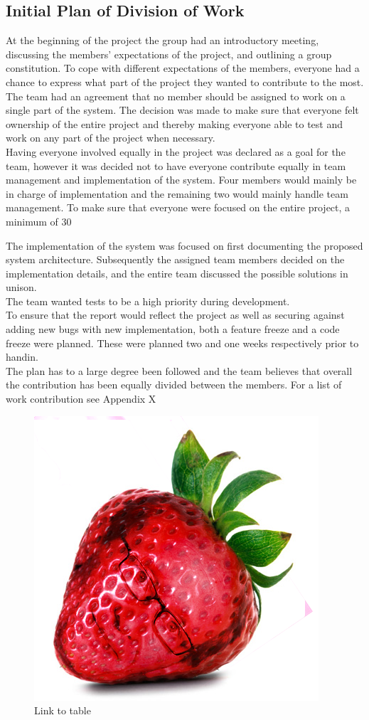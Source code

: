 \subsection{Initial Plan of Division of Work}
At the beginning of the project the group had an introductory meeting, discussing the members’ expectations of the project, and outlining a group constitution. \newline
To cope with different expectations of the members, everyone had a chance to express what part of the project they wanted to contribute to the most. The team had an agreement that no member should be assigned to work on a single part of the system. The decision was made to make sure that everyone felt ownership of the entire project and thereby making everyone able to test and work on any part of the project when necessary. \\

Having everyone involved equally in the project was declared as a goal for the team, however it was decided not to have everyone contribute equally in team management and implementation of the system. Four members would mainly be in charge of implementation and the remaining two would mainly handle team management. To make sure that everyone were focused on the entire project, a minimum of 30%

The implementation of the system was focused on first documenting the proposed system architecture. Subsequently the assigned team members decided on the implementation details, and the entire team discussed the possible solutions in unison.\\

The team wanted tests to be a high priority during development.\\

To ensure that the report would reflect the project as well as securing against adding new bugs with new implementation, both a feature freeze and a code freeze were planned. These were planned two and one weeks respectively prior to handin.\\

The plan has to a large degree been followed and the team believes that overall the contribution has been equally divided between the members. For a list of work contribution see Appendix X

\begin{figure}
\centering
\includegraphics[width=0.5\linewidth]{Figures/strawberry.png}
\caption{Link to table}
\end{figure}